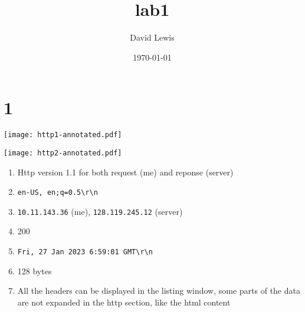 \documentclass[11pt]{article}
\author{David Lewis}
\date{\today}
\title{lab1}
\begin{document}
\maketitle
\section*{1}
\label{sec:org5e80869}
\begin{center}
\texttt{[image: http1-annotated.pdf]}
\end{center}
\begin{center}
\texttt{[image: http2-annotated.pdf]}
\end{center}
\begin{enumerate}
\item Http version 1.1 for both request (me) and reponse (server)
\item \texttt{en-US, en;q=0.5\textbackslash{}r\textbackslash{}n}
\item \texttt{10.11.143.36} (me), \texttt{128.119.245.12} (server)
\item 200
\item \texttt{Fri, 27 Jan 2023 6:59:01 GMT\textbackslash{}r\textbackslash{}n}
\item 128 bytes
\item All the headers can be displayed in the listing window, some parts of the
data are not expanded in the http section, like the html content
\end{enumerate}
\end{document}
